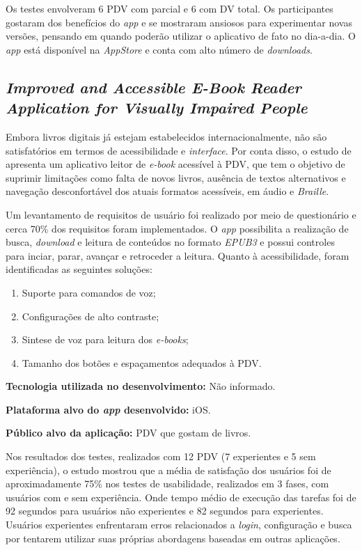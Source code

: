 Os testes envolveram 6 PDV com parcial e 6 com DV total.
Os participantes gostaram dos benefícios do \emph{app} e se mostraram ansiosos para experimentar novas versões, pensando em quando poderão utilizar o aplicativo de fato no dia-a-dia.
O \emph{app} está disponível na \emph{AppStore} e conta com alto número de \emph{downloads}.

\subsection{\emph{Improved and Accessible E-Book Reader Application for Visually Impaired People}}

Embora livros digitais já estejam estabelecidos internacionalmente, não são satisfatórios em termos de acessibilidade e \emph{interface}.
Por conta disso, o estudo de  apresenta um aplicativo leitor de \emph{e-book} acessível à PDV, que tem o objetivo de suprimir limitações como falta de novos livros, ausência de textos alternativos e navegação desconfortável dos atuais formatos acessíveis, em áudio e \emph{Braille}.

Um levantamento de requisitos de usuário foi realizado por meio de questionário e cerca 70\% dos requisitos foram implementados.
O \emph{app} possibilita a realização de busca, \emph{download} e leitura de conteúdos no formato \emph{EPUB3} e possui controles para inciar, parar, avançar e retroceder a leitura.
Quanto à acessibilidade, foram identificadas as seguintes soluções:

\begin{enumerate}
    \item Suporte para comandos de voz;
    \item Configurações de alto contraste;
    \item Sintese de voz para leitura dos \emph{e-books};
    \item Tamanho dos botões e espaçamentos adequados à PDV\@.
\end{enumerate}

\textbf{Tecnologia utilizada no desenvolvimento:} Não informado.

\textbf{Plataforma alvo do \emph{app} desenvolvido:} iOS.

\textbf{Público alvo da aplicação:} PDV que gostam de livros\@.

Nos resultados dos testes, realizados com 12 PDV (7 experientes e 5 sem experiência), o estudo mostrou que a média de satisfação dos usuários foi de aproximadamente 75\% nos testes de usabilidade, realizados em 3 fases, com usuários com e sem experiência.
Onde tempo médio de execução das tarefas foi de 92 segundos para usuários não experientes e 82 segundos para experientes.
Usuários experientes enfrentaram erros relacionados a \emph{login}, configuração e busca por tentarem utilizar suas próprias abordagens baseadas em outras aplicações.


